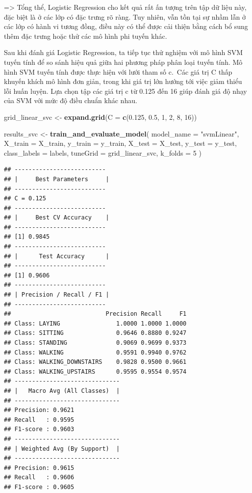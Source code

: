 \documentclass[
]{article}
\newenvironment{Shaded}{\begin{snugshade}}{\end{snugshade}}
\newcommand{\AttributeTok}[1]{\textcolor[rgb]{0.13,0.29,0.53}{#1}}
\newcommand{\DecValTok}[1]{\textcolor[rgb]{0.00,0.00,0.81}{#1}}
\newcommand{\FloatTok}[1]{\textcolor[rgb]{0.00,0.00,0.81}{#1}}
\newcommand{\FunctionTok}[1]{\textcolor[rgb]{0.13,0.29,0.53}{\textbf{#1}}}
\newcommand{\NormalTok}[1]{#1}
\newcommand{\OtherTok}[1]{\textcolor[rgb]{0.56,0.35,0.01}{#1}}
\newcommand{\StringTok}[1]{\textcolor[rgb]{0.31,0.60,0.02}{#1}}
\begin{document}
=\textgreater{} Tổng thể, Logistic Regression cho kết quả rất ấn tượng
trên tập dữ liệu này, đặc biệt là ở các lớp có đặc trưng rõ ràng. Tuy
nhiên, vẫn tồn tại sự nhầm lẫn ở các lớp có hành vi tương đồng, điều này
có thể được cải thiện bằng cách bổ sung thêm đặc trưng hoặc thử các mô
hình phi tuyến khác.

Sau khi đánh giá Logistic Regression, ta tiếp tục thử nghiệm với mô hình
SVM tuyến tính để so sánh hiệu quả giữa hai phương pháp phân loại tuyến
tính. Mô hình SVM tuyến tính được thực hiện với lưới tham số c.~Các giá
trị C thấp khuyến khích mô hình đơn giản, trong khi giá trị lớn hướng
tới việc giảm thiểu lỗi huấn luyện. Lựa chọn tập các giá trị c từ 0.125
đến 16 giúp đánh giá độ nhạy của SVM với mức độ điều chuẩn khác nhau.

\begin{Shaded}
\begin{Highlighting}[]
\NormalTok{grid\_linear\_svc }\OtherTok{\textless{}{-}} \FunctionTok{expand.grid}\NormalTok{(}\AttributeTok{C =} \FunctionTok{c}\NormalTok{(}\FloatTok{0.125}\NormalTok{, }\FloatTok{0.5}\NormalTok{, }\DecValTok{1}\NormalTok{, }\DecValTok{2}\NormalTok{, }\DecValTok{8}\NormalTok{, }\DecValTok{16}\NormalTok{))}

\NormalTok{results\_svc }\OtherTok{\textless{}{-}} \FunctionTok{train\_and\_evaluate\_model}\NormalTok{(}
  \AttributeTok{model\_name =} \StringTok{"svmLinear"}\NormalTok{,}
  \AttributeTok{X\_train =}\NormalTok{ X\_train, }\AttributeTok{y\_train =}\NormalTok{ y\_train,}
  \AttributeTok{X\_test =}\NormalTok{ X\_test, }\AttributeTok{y\_test =}\NormalTok{ y\_test,}
  \AttributeTok{class\_labels =}\NormalTok{ labels,}
  \AttributeTok{tuneGrid =}\NormalTok{ grid\_linear\_svc,}
  \AttributeTok{k\_folds =} \DecValTok{5}
\NormalTok{)}
\end{Highlighting}
\end{Shaded}

\begin{verbatim}
## --------------------------
## |     Best Parameters     |
## --------------------------
## C = 0.125
## --------------------------
## |     Best CV Accuracy    |
## --------------------------
## [1] 0.9845
## --------------------------
## |      Test Accuracy      |
## --------------------------
## [1] 0.9606
## --------------------------
## | Precision / Recall / F1 |
## --------------------------
##                           Precision Recall     F1
## Class: LAYING                1.0000 1.0000 1.0000
## Class: SITTING               0.9646 0.8880 0.9247
## Class: STANDING              0.9069 0.9699 0.9373
## Class: WALKING               0.9591 0.9940 0.9762
## Class: WALKING_DOWNSTAIRS    0.9828 0.9500 0.9661
## Class: WALKING_UPSTAIRS      0.9595 0.9554 0.9574
## ------------------------------
## |   Macro Avg (All Classes)  |
## ------------------------------
## Precision: 0.9621
## Recall   : 0.9595
## F1-score : 0.9603
## ------------------------------
## | Weighted Avg (By Support)  |
## ------------------------------
## Precision: 0.9615
## Recall   : 0.9606
## F1-score : 0.9605
\end{verbatim}
\end{document}
